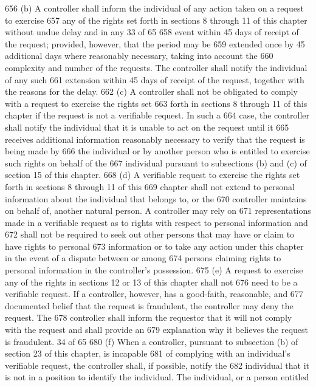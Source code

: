 656 (b) A controller shall inform the individual of any action taken on a request to exercise
657 any of the rights set forth in sections 8 through 11 of this chapter without undue delay and in any
33 of 65
658 event within 45 days of receipt of the request; provided, however, that the period may be
659 extended once by 45 additional days where reasonably necessary, taking into account the
660 complexity and number of the requests. The controller shall notify the individual of any such
661 extension within 45 days of receipt of the request, together with the reasons for the delay.
662 (c) A controller shall not be obligated to comply with a request to exercise the rights set
663 forth in sections 8 through 11 of this chapter if the request is not a verifiable request. In such a
664 case, the controller shall notify the individual that it is unable to act on the request until it
665 receives additional information reasonably necessary to verify that the request is being made by
666 the individual or by another person who is entitled to exercise such rights on behalf of the
667 individual pursuant to subsections (b) and (c) of section 15 of this chapter.
668 (d) A verifiable request to exercise the rights set forth in sections 8 through 11 of this
669 chapter shall not extend to personal information about the individual that belongs to, or the
670 controller maintains on behalf of, another natural person. A controller may rely on
671 representations made in a verifiable request as to rights with respect to personal information and
672 shall not be required to seek out other persons that may have or claim to have rights to personal
673 information or to take any action under this chapter in the event of a dispute between or among
674 persons claiming rights to personal information in the controller’s possession.
675 (e) A request to exercise any of the rights in sections 12 or 13 of this chapter shall not
676 need to be a verifiable request. If a controller, however, has a good-faith, reasonable, and
677 documented belief that the request is fraudulent, the controller may deny the request. The
678 controller shall inform the requestor that it will not comply with the request and shall provide an
679 explanation why it believes the request is fraudulent.
34 of 65
680 (f) When a controller, pursuant to subsection (b) of section 23 of this chapter, is incapable
681 of complying with an individual’s verifiable request, the controller shall, if possible, notify the
682 individual that it is not in a position to identify the individual. The individual, or a person entitled
